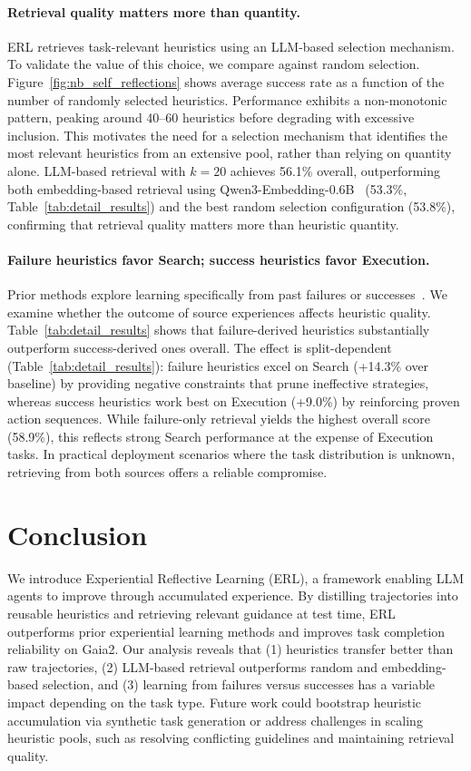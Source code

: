 \documentclass{article}
\begin{document}
\paragraph{Retrieval quality matters more than quantity.}
ERL retrieves task-relevant heuristics using an LLM-based selection mechanism. To validate the value of this choice, we compare against random selection. Figure~\ref{fig:nb_self_reflections} shows average success rate as a function of the number of randomly selected heuristics. Performance exhibits a non-monotonic pattern, peaking around 40–60 heuristics before degrading with excessive inclusion. This motivates the need for a selection mechanism that identifies the most relevant heuristics from an extensive pool, rather than relying on quantity alone. LLM-based retrieval with $k=20$ achieves 56.1\% overall, outperforming both embedding-based retrieval using Qwen3-Embedding-0.6B~\citep{zhang2025qwen3embeddingadvancingtext} (53.3\%, Table~\ref{tab:detail_results}) and the best random selection configuration (53.8\%), confirming that retrieval quality matters more than heuristic quantity.

\paragraph{Failure heuristics favor Search; success heuristics favor Execution.}
Prior methods explore learning specifically from past failures or successes~\citep{sarukkai2025selfgeneratedincontextexamplesimprove,zhao2024expel,shinn2023reflexion}. We examine whether the outcome of source experiences affects heuristic quality. Table~\ref{tab:detail_results} shows that failure-derived heuristics substantially outperform success-derived ones overall. The effect is split-dependent (Table~\ref{tab:detail_results}): failure heuristics excel on Search (+14.3\% over baseline) by providing negative constraints that prune ineffective strategies, whereas success heuristics work best on Execution (+9.0\%) by reinforcing proven action sequences. While failure-only retrieval yields the highest overall score (58.9\%), this reflects strong Search performance at the expense of Execution tasks. In practical deployment scenarios where the task distribution is unknown, retrieving from both sources offers a reliable compromise.

\section{Conclusion}
We introduce Experiential Reflective Learning (ERL), a framework enabling LLM agents to improve through accumulated experience. By distilling trajectories into reusable heuristics and retrieving relevant guidance at test time, ERL outperforms prior experiential learning methods and improves task completion reliability on Gaia2. Our analysis reveals that (1) heuristics transfer better than raw trajectories, (2) LLM-based retrieval outperforms random and embedding-based selection, and (3) learning from failures versus successes has a variable impact depending on the task type. Future work could bootstrap heuristic accumulation via synthetic task generation or address challenges in scaling heuristic pools, such as resolving conflicting guidelines and maintaining retrieval quality.
\end{document}

